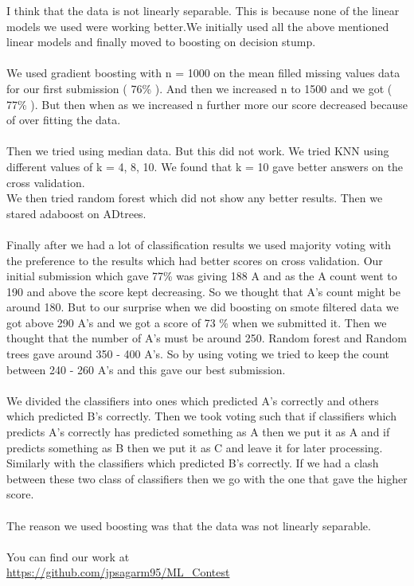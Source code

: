\documentclass{article}
\begin{document}
I think that the data is not linearly separable. This is because none of the linear models we used were working better.We initially used all the above mentioned linear models and finally moved to boosting on decision stump.\\
\\
We used gradient boosting with n = 1000 on the mean filled missing values data for our first submission ( 76\% ). And then we increased n to 1500 and we got ( 77\% ). But then when as we increased n further more our score decreased because of over fitting the data.\\
\\
Then we tried using median data. But this did not work. We tried KNN using different values of k = 4, 8, 10. We found that k = 10 gave better answers on the cross validation.\\
We then tried random forest which did not show any better results. Then we stared adaboost on ADtrees.\\
\\
Finally after we had a lot of classification results we used majority voting with the preference to the results which had better scores on cross validation. Our initial submission which gave 77\% was giving 188 A and as the A count went to 190 and above the score kept decreasing. So we thought that A's count might be around 180. But to our surprise when we did boosting on smote filtered data we got above 290 A's and we got a score of 73 \% when we submitted it. Then we thought that the number of A's must be around 250. Random forest and Random trees gave around 350 - 400 A's. So by using voting we tried to keep the count between 240 - 260 A's and this gave our best submission.\\
\\
We divided the classifiers into ones which predicted A's correctly and others which predicted B's correctly. Then we took voting such that if classifiers which predicts A's correctly has predicted something as A then we put it as A and if predicts something as B then we put it as C and leave it for later processing. Similarly with the classifiers which predicted B's correctly. If we had a clash between these two class of classifiers then we go with the one that gave the higher score.\\
\\
The reason we used boosting was that the data was not linearly separable.\\
\\
You can find our work at\\ \url{https://github.com/jpsagarm95/ML_Contest}
\end{document}
